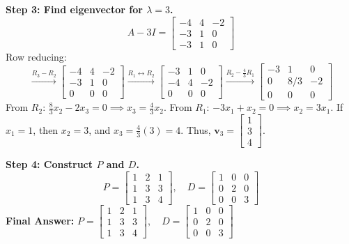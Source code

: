 \documentclass[11pt, a4paper]{article}
\theoremstyle{definition}
\theoremstyle{remark}
\begin{document}
\textbf{Step 3: Find eigenvector for $\lambda = 3$.}
\[
A - 3I = \begin{bmatrix} -4 & 4 & -2 \\ -3 & 1 & 0 \\ -3 & 1 & 0 \end{bmatrix}
\]
Row reducing:
\[
\xrightarrow{R_3 - R_2} \begin{bmatrix} -4 & 4 & -2 \\ -3 & 1 & 0 \\ 0 & 0 & 0 \end{bmatrix} \xrightarrow{R_1 \leftrightarrow R_2} \begin{bmatrix} -3 & 1 & 0 \\ -4 & 4 & -2 \\ 0 & 0 & 0 \end{bmatrix} \xrightarrow{R_2 - \frac{4}{3}R_1} \begin{bmatrix} -3 & 1 & 0 \\ 0 & 8/3 & -2 \\ 0 & 0 & 0 \end{bmatrix}
\]
From $R_2$: $\frac{8}{3}x_2 - 2x_3 = 0 \implies x_3 = \frac{4}{3}x_2$.
From $R_1$: $-3x_1 + x_2 = 0 \implies x_2 = 3x_1$.
If $x_1 = 1$, then $x_2 = 3$, and $x_3 = \frac{4}{3}(3) = 4$. Thus, $\mathbf{v}_3 = \begin{bmatrix} 1 \\ 3 \\ 4 \end{bmatrix}$.

\textbf{Step 4: Construct $P$ and $D$.}
\[
P = \begin{bmatrix} 1 & 2 & 1 \\ 1 & 3 & 3 \\ 1 & 3 & 4 \end{bmatrix}, \quad D = \begin{bmatrix} 1 & 0 & 0 \\ 0 & 2 & 0 \\ 0 & 0 & 3 \end{bmatrix}
\]
\textbf{Final Answer:} $\displaystyle P = \begin{bmatrix} 1 & 2 & 1 \\ 1 & 3 & 3 \\ 1 & 3 & 4 \end{bmatrix}, \quad D = \begin{bmatrix} 1 & 0 & 0 \\ 0 & 2 & 0 \\ 0 & 0 & 3 \end{bmatrix}$
\end{document}
